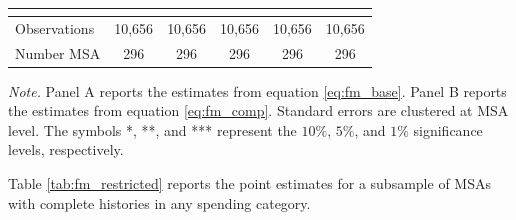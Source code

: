 \documentclass[dv_diss_main.tex]{subfiles}
\begin{document}
\begin{table}[H]
\begin{center}
{\begin{tabular}{lccccc}
    \vspace{4pt} & \begin{footnotesize}\end{footnotesize} & \begin{footnotesize}\end{footnotesize} & \begin{footnotesize}\end{footnotesize} & \begin{footnotesize}\end{footnotesize} & \begin{footnotesize}\end{footnotesize} \\
    \hline
    Observations & 10,656 & 10,656 & 10,656 & 10,656 & 10,656 \\
    Number MSA & 296 & 296 & 296 & 296 & 296 \\
    \hline
    \end{tabular}
    }
    
    \end{center}
        
    \footnotesize{\textit{Note. }Panel A reports the estimates from equation \eqref{eq:fm_base}. Panel B reports the estimates from equation \eqref{eq:fm_comp}. Standard errors are clustered at MSA level. The symbols *, **, and *** represent the $10\%$, $5\%$, and $1\%$ significance levels, respectively.}
\end{table}

\newpage 
Table \ref{tab:fm_restricted} reports the point estimates for a subsample of MSAs with complete histories in any spending category.
\end{document}
